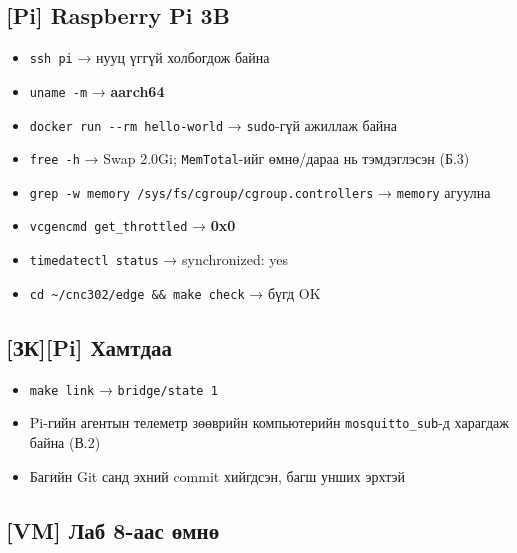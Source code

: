 \hypertarget{pi-raspberry-pi-3b}{%
\subsection{{[}Pi{]} Raspberry Pi 3B}\label{pi-raspberry-pi-3b}}

\begin{itemize}
\tightlist
\item[$\square$]
  \texttt{ssh\ pi} → нууц үггүй холбогдож байна
\item[$\square$]
  \texttt{uname\ -m} → \textbf{aarch64}
\item[$\square$]
  \texttt{docker\ run\ -\/\allowbreak{}-rm\ hello-world} → \texttt{sudo}-гүй ажиллаж байна
\item[$\square$]
  \texttt{free\ -h} → Swap 2.0Gi; \texttt{MemTotal}-ийг өмнө/дараа нь тэмдэглэсэн (Б.3)
\item[$\square$]
  \texttt{grep\ -w\ memory\ /\allowbreak{}sys/\allowbreak{}fs/\allowbreak{}cgroup/\allowbreak{}cgroup.\allowbreak{}controllers} → \texttt{memory} агуулна
\item[$\square$]
  \texttt{vcgencmd\ get\_\allowbreak{}throttled} → \textbf{0x0}
\item[$\square$]
  \texttt{timedatectl\ status} → synchronized: yes
\item[$\square$]
  \texttt{cd\ \textasciitilde{}/cnc302/edge\ \&\&\ make\ check} → бүгд OK
\end{itemize}

\hypertarget{ux437ux43api-ux445ux430ux43cux442ux434ux430ux430}{%
\subsection{{[}ЗК{]}{[}Pi{]} Хамтдаа}\label{ux437ux43api-ux445ux430ux43cux442ux434ux430ux430}}

\begin{itemize}
\tightlist
\item[$\square$]
  \texttt{make\ link} → \texttt{bridge/state\ 1}
\item[$\square$]
  Pi-гийн агентын телеметр зөөврийн компьютерийн \texttt{mosquitto\_sub}-д харагдаж байна (В.2)
\item[$\square$]
  Багийн Git санд эхний commit хийгдсэн, багш унших эрхтэй
\end{itemize}

\hypertarget{vm-ux43bux430ux431-8-ux430ux430ux441-ux4e9ux43cux43dux4e9}{%
\subsection{{[}VM{]} Лаб 8-аас өмнө}\label{vm-ux43bux430ux431-8-ux430ux430ux441-ux4e9ux43cux43dux4e9}}

